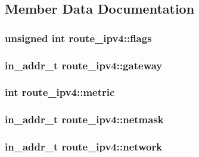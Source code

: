 \subsection{Member Data Documentation}
\hypertarget{structroute__ipv4_aefec4e9a3022ad0d5e6f8c68905d2ad7}{}
\subsubsection[{flags}]{\setlength{\rightskip}{0pt plus 5cm}unsigned int route\+\_\+ipv4\+::flags}\label{structroute__ipv4_aefec4e9a3022ad0d5e6f8c68905d2ad7}
\hypertarget{structroute__ipv4_ad7a3c222084b1c670a62dc6d3d0f2fb5}{}
\subsubsection[{gateway}]{\setlength{\rightskip}{0pt plus 5cm}in\+\_\+addr\+\_\+t route\+\_\+ipv4\+::gateway}\label{structroute__ipv4_ad7a3c222084b1c670a62dc6d3d0f2fb5}
\hypertarget{structroute__ipv4_a05f41b340e53a6c8292fefc84204ea74}{}
\subsubsection[{metric}]{\setlength{\rightskip}{0pt plus 5cm}int route\+\_\+ipv4\+::metric}\label{structroute__ipv4_a05f41b340e53a6c8292fefc84204ea74}
\hypertarget{structroute__ipv4_ac423abdde955f3da899a72382763b470}{}
\subsubsection[{netmask}]{\setlength{\rightskip}{0pt plus 5cm}in\+\_\+addr\+\_\+t route\+\_\+ipv4\+::netmask}\label{structroute__ipv4_ac423abdde955f3da899a72382763b470}
\hypertarget{structroute__ipv4_ab38b0a2ab01c05b74c40c32b9b486e96}{}
\subsubsection[{network}]{\setlength{\rightskip}{0pt plus 5cm}in\+\_\+addr\+\_\+t route\+\_\+ipv4\+::network}\label{structroute__ipv4_ab38b0a2ab01c05b74c40c32b9b486e96}
\hypertarget{structroute__ipv4_a49d3bfec5422f032e85505762ed45507}{}
